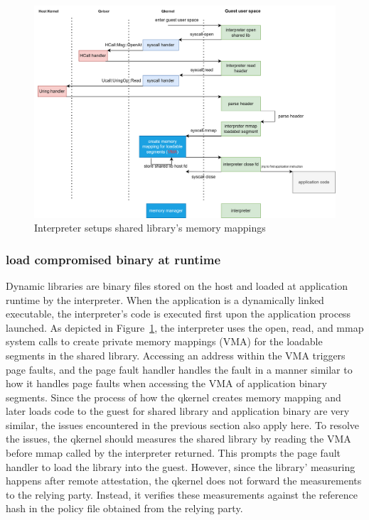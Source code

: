 \begin{figure}[H]
  \centering
  \includegraphics[width=1\textwidth]{images/load_shared_libarart.png}
  \caption[Interpreter setups shared library's memory mappings]{Interpreter setups shared library's memory mappings}
  \label{fig:load_shared_libarart}
\end{figure}


\subsubsection{load compromised binary at runtime}

Dynamic libraries are binary files stored on the host and loaded at application runtime by the interpreter. When the application is a dynamically linked executable, the interpreter's code is executed first upon the application process launched.  
As depicted in Figure~\ref{fig:load_shared_libarart}, the interpreter uses the open, read, and mmap system calls to create private memory mappings (VMA) for the loadable segments in the shared library.  Accessing an address within the VMA triggers 
page faults, and the page fault handler handles the fault in a manner similar to how it handles page faults when accessing the VMA of application binary segments.   Since the process of how the qkernel creates memory mapping and later loads code to 
the guest for shared library and application binary are very similar, the issues encountered in the previous section also apply here. To resolve the issues, the qkernel should measures the shared library by reading the VMA before mmap called by the interpreter 
returned. This prompts the page fault handler to load the library into the guest. However, since the library’ measuring happens after remote attestation, the qkernel does not forward the measurements to the relying party. Instead, it 
verifies these measurements against the reference hash in the policy file obtained from the relying party.

